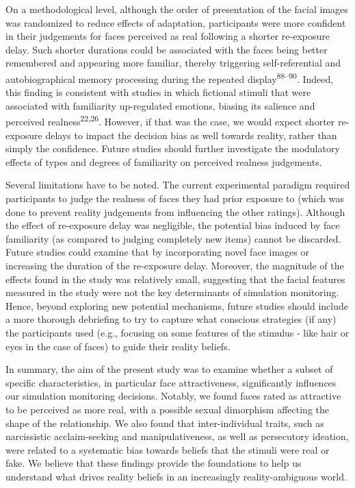 \documentclass[
  man,floatsintext]{apa6}
\begin{document}
On a methodological level, although the order of presentation of the facial images was randomized to reduce effects of adaptation, participants were more confident in their judgements for faces perceived as real following a shorter re-exposure delay. Such shorter durations could be associated with the faces being better remembered and appearing more familiar, thereby triggering self-referential and autobiographical memory processing during the repeated display\textsuperscript{88--90}. Indeed, this finding is consistent with studies in which fictional stimuli that were associated with familiarity up-regulated emotions, biasing its salience and perceived realness\textsuperscript{22,26}. However, if that was the case, we would expect shorter re-exposure delays to impact the decision bias as well towards reality, rather than simply the confidence. Future studies should further investigate the modulatory effects of types and degrees of familiarity on perceived realness judgements.

Several limitations have to be noted. The current experimental paradigm required participants to judge the realness of faces they had prior exposure to (which was done to prevent reality judgements from influencing the other ratings). Although the effect of re-exposure delay was negligible, the potential bias induced by face familiarity (as compared to judging completely new items) cannot be discarded. Future studies could examine that by incorporating novel face images or increasing the duration of the re-exposure delay. Moreover, the magnitude of the effects found in the study was relatively small, suggesting that the facial features measured in the study were not the key determinants of simulation monitoring. Hence, beyond exploring new potential mechanisms, future studies should include a more thorough debriefing to try to capture what conscious strategies (if any) the participants used (e.g., focusing on some features of the stimulus - like hair or eyes in the case of faces) to guide their reality beliefs.

In summary, the aim of the present study was to examine whether a subset of specific characteristics, in particular face attractiveness, significantly influences our simulation monitoring decisions. Notably, we found faces rated as attractive to be perceived as more real, with a possible sexual dimorphism affecting the shape of the relationship. We also found that inter-individual traits, such as narcissistic acclaim-seeking and manipulativeness, as well as persecutory ideation, were related to a systematic bias towards beliefs that the stimuli were real or fake. We believe that these findings provide the foundations to help us understand what drives reality beliefs in an increasingly reality-ambiguous world.
\end{document}
